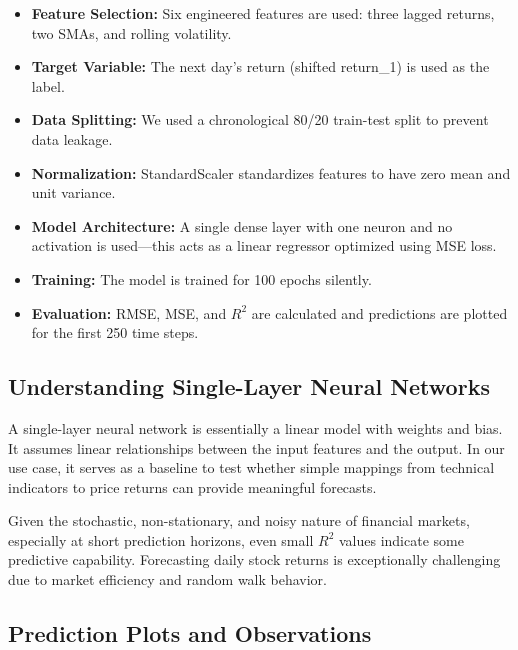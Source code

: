 \documentclass[12pt]{article}
\begin{document}
\begin{itemize}
  \item \textbf{Feature Selection:} Six engineered features are used: three lagged returns, two SMAs, and rolling volatility.
  \item \textbf{Target Variable:} The next day's return (shifted return\_1) is used as the label.
  \item \textbf{Data Splitting:} We used a chronological 80/20 train-test split to prevent data leakage.
  \item \textbf{Normalization:} StandardScaler standardizes features to have zero mean and unit variance.
  \item \textbf{Model Architecture:} A single dense layer with one neuron and no activation is used—this acts as a linear regressor optimized using MSE loss.
  \item \textbf{Training:} The model is trained for 100 epochs silently.
  \item \textbf{Evaluation:} RMSE, MSE, and $R^2$ are calculated and predictions are plotted for the first 250 time steps.
\end{itemize}

\subsection{Understanding Single-Layer Neural Networks}
A single-layer neural network is essentially a linear model with weights and bias. It assumes linear relationships between the input features and the output. In our use case, it serves as a baseline to test whether simple mappings from technical indicators to price returns can provide meaningful forecasts.

Given the stochastic, non-stationary, and noisy nature of financial markets, especially at short prediction horizons, even small $R^2$ values indicate some predictive capability. Forecasting daily stock returns is exceptionally challenging due to market efficiency and random walk behavior.

\subsection{Prediction Plots and Observations}
\end{document}
